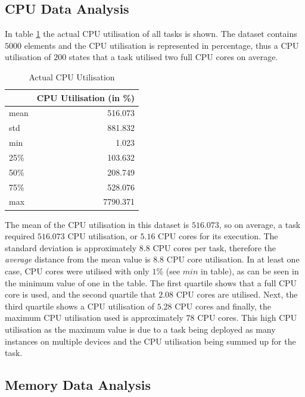   \subsection{CPU Data Analysis}
  \label{sec:cpu-data-analysis}

    In table \ref{tab:actual-cpu-utilisation} the actual CPU utilisation of all tasks is shown.
    The dataset contains $5000$ elements and the CPU utilisation is represented in percentage, 
    thus a CPU utilisation of $200$ states that a task utilised two full CPU cores on average.
    \begin{table}
      \centering
      \caption{Actual CPU Utilisation}
      \label{tab:actual-cpu-utilisation}
      \begin{tabular}{|l|r|}
        \toprule
        {} &  CPU Utilisation (in \%) \\
        \midrule
        mean  &    516.073 \\
        std   &    881.832 \\
        min   &      1.023 \\
        25\%   &    103.632 \\
        50\%   &    208.749 \\
        75\%   &    528.076 \\
        max   &   7790.371 \\
        \bottomrule
      \end{tabular}
    \end{table}
    The mean of the CPU utilisation in this dataset is $516.073$, 
    so on average, a task required $516.073$ CPU utilisation, or $5.16$ CPU cores for its execution.
    The standard deviation is approximately $8.8$ CPU cores per task, therefore the \emph{average} distance from the mean value is $8.8$ CPU core utilisation.
    In at least one case, CPU cores were utilised with only $1 \%$ (see $min$ in table), as can be seen in the minimum value of one in the table.
    The first quartile shows that a full CPU core is used, and the second quartile that $2.08$ CPU cores are utilised.
    Next, the third quartile shows a CPU utilisation of $5.28$ CPU cores and finally, the maximum CPU utilisation used is approximately $78$ CPU cores. This high CPU utilisation as the maximum value is due to a task being deployed as many instances on multiple devices and the CPU utilisation being summed up for the task.
  

  \subsection{Memory Data Analysis}
  \label{sec:memory-data-analysis}

